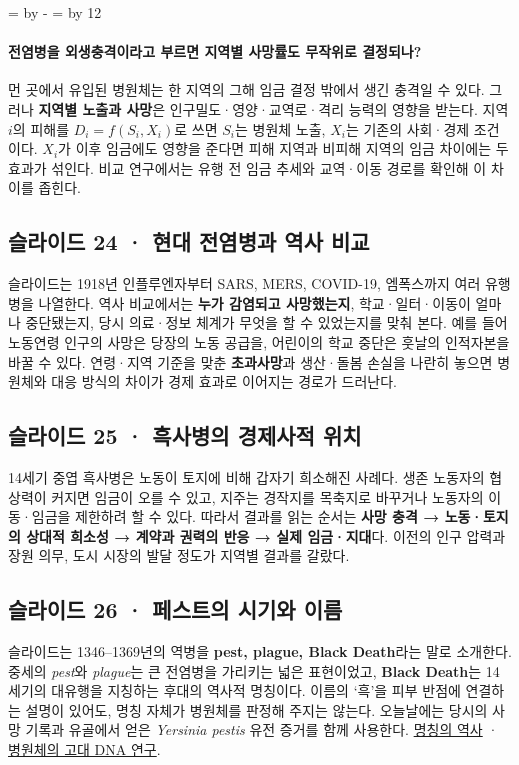 \documentclass[10pt,a4paper]{article}
\newcommand{\ReserveQuestionSpace}{%
  \par\begingroup
  \dimen0=\pagegoal \advance\dimen0 by -\pagetotal
  \dimen2=\baselineskip \multiply\dimen2 by 12
  \ifdim\dimen0<\dimen2 \newpage\fi
  \endgroup}
\begin{document}
\ReserveQuestionSpace
\paragraph{전염병을 외생충격이라고 부르면 지역별 사망률도 무작위로 결정되나?}
먼 곳에서 유입된 병원체는 한 지역의 그해 임금 결정 밖에서 생긴 충격일 수 있다. 그러나 \textbf{지역별 노출과 사망}은 인구밀도·영양·교역로·격리 능력의 영향을 받는다. 지역 $i$의 피해를 $D_i=f(S_i,X_i)$로 쓰면 $S_i$는 병원체 노출, $X_i$는 기존의 사회·경제 조건이다. $X_i$가 이후 임금에도 영향을 준다면 피해 지역과 비피해 지역의 임금 차이에는 두 효과가 섞인다. 비교 연구에서는 유행 전 임금 추세와 교역·이동 경로를 확인해 이 차이를 좁힌다.\par

\subsection{슬라이드 24 · 현대 전염병과 역사 비교}
슬라이드는 1918년 인플루엔자부터 SARS, MERS, COVID-19, 엠폭스까지 여러 유행병을 나열한다. 역사 비교에서는 \textbf{누가 감염되고 사망했는지}, 학교·일터·이동이 얼마나 중단됐는지, 당시 의료·정보 체계가 무엇을 할 수 있었는지를 맞춰 본다. 예를 들어 노동연령 인구의 사망은 당장의 노동 공급을, 어린이의 학교 중단은 훗날의 인적자본을 바꿀 수 있다. 연령·지역 기준을 맞춘 \textbf{초과사망}과 생산·돌봄 손실을 나란히 놓으면 병원체와 대응 방식의 차이가 경제 효과로 이어지는 경로가 드러난다.\par

\subsection{슬라이드 25 · 흑사병의 경제사적 위치}
14세기 중엽 흑사병은 노동이 토지에 비해 갑자기 희소해진 사례다. 생존 노동자의 협상력이 커지면 임금이 오를 수 있고, 지주는 경작지를 목축지로 바꾸거나 노동자의 이동·임금을 제한하려 할 수 있다. 따라서 결과를 읽는 순서는 \textbf{사망 충격 → 노동·토지의 상대적 희소성 → 계약과 권력의 반응 → 실제 임금·지대}다. 이전의 인구 압력과 장원 의무, 도시 시장의 발달 정도가 지역별 결과를 갈랐다.\par

\subsection{슬라이드 26 · 페스트의 시기와 이름}
슬라이드는 1346–1369년의 역병을 \textbf{pest, plague, Black Death}라는 말로 소개한다. 중세의 \emph{pest}와 \emph{plague}는 큰 전염병을 가리키는 넓은 표현이었고, \textbf{Black Death}는 14세기의 대유행을 지칭하는 후대의 역사적 명칭이다. 이름의 ‘흑’을 피부 반점에 연결하는 설명이 있어도, 명칭 자체가 병원체를 판정해 주지는 않는다. 오늘날에는 당시의 사망 기록과 유골에서 얻은 \emph{Yersinia pestis} 유전 증거를 함께 사용한다. \href{https://www.cambridge.org/core/books/abs/complete-history-of-the-black-death/black-death/C320576428C0D439ABC026C5CA359A6E}{명칭의 역사} · \href{https://www.nature.com/articles/s41586-022-04800-3}{병원체의 고대 DNA 연구}.\par
\end{document}
